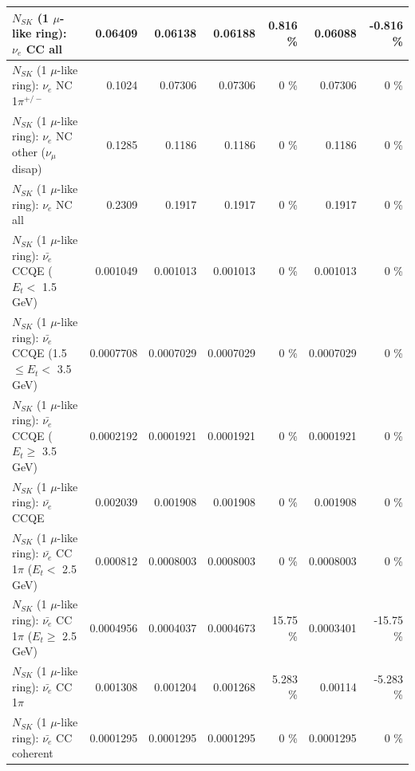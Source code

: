 \begin{table}
\begin{tabular}{| l | r | r | r  r | r  r |}
                                  $N_{SK}$ (1 $\mu$-like ring): $\nu_{e}$ CC all &         0.06409 &         0.06138 &         0.06188 &    0.816 \%  &         0.06088 &   -0.816 \%  \\ 
\hline
                           $N_{SK}$ (1 $\mu$-like ring): $\nu_e$ NC 1$\pi^{+/-}$ &          0.1024 &         0.07306 &         0.07306 &        0 \%  &         0.07306 &        0 \%  \\ 
                $N_{SK}$ (1 $\mu$-like ring): $\nu_e$ NC other ($\nu_\mu$ disap) &          0.1285 &          0.1186 &          0.1186 &        0 \%  &          0.1186 &        0 \%  \\ 
                                  $N_{SK}$ (1 $\mu$-like ring): $\nu_{e}$ NC all &          0.2309 &          0.1917 &          0.1917 &        0 \%  &          0.1917 &        0 \%  \\ 
\hline
\hline
\hline
            $N_{SK}$ (1 $\mu$-like ring): $\bar{\nu_e}$ CCQE ($E_{t} <$ 1.5 GeV) &        0.001049 &        0.001013 &        0.001013 &        0 \%  &        0.001013 &        0 \%  \\ 
   $N_{SK}$ (1 $\mu$-like ring): $\bar{\nu_e}$ CCQE (1.5 $\leq E_{t} <$ 3.5 GeV) &       0.0007708 &       0.0007029 &       0.0007029 &        0 \%  &       0.0007029 &        0 \%  \\ 
         $N_{SK}$ (1 $\mu$-like ring): $\bar{\nu_e}$ CCQE ($E_{t} \geq$ 3.5 GeV) &       0.0002192 &       0.0001921 &       0.0001921 &        0 \%  &       0.0001921 &        0 \%  \\ 
\hline
                                $N_{SK}$ (1 $\mu$-like ring): $\bar{\nu_e}$ CCQE &        0.002039 &        0.001908 &        0.001908 &        0 \%  &        0.001908 &        0 \%  \\ 
\hline
       $N_{SK}$ (1 $\mu$-like ring): $\bar{\nu_e}$ CC 1$\pi$ ($E_{t} <$ 2.5 GeV) &        0.000812 &       0.0008003 &       0.0008003 &        0 \%  &       0.0008003 &        0 \%  \\ 
    $N_{SK}$ (1 $\mu$-like ring): $\bar{\nu_e}$ CC 1$\pi$ ($E_{t} \geq$ 2.5 GeV) &       0.0004956 &       0.0004037 &       0.0004673 &    15.75 \%  &       0.0003401 &   -15.75 \%  \\ 
\hline
                           $N_{SK}$ (1 $\mu$-like ring): $\bar{\nu_e}$ CC 1$\pi$ &        0.001308 &        0.001204 &        0.001268 &    5.283 \%  &         0.00114 &   -5.283 \%  \\ 
                         $N_{SK}$ (1 $\mu$-like ring): $\bar{\nu_e}$ CC coherent &       0.0001295 &       0.0001295 &       0.0001295 &        0 \%  &       0.0001295 &        0 \%  \\ 

\end{tabular}
\end{table}
